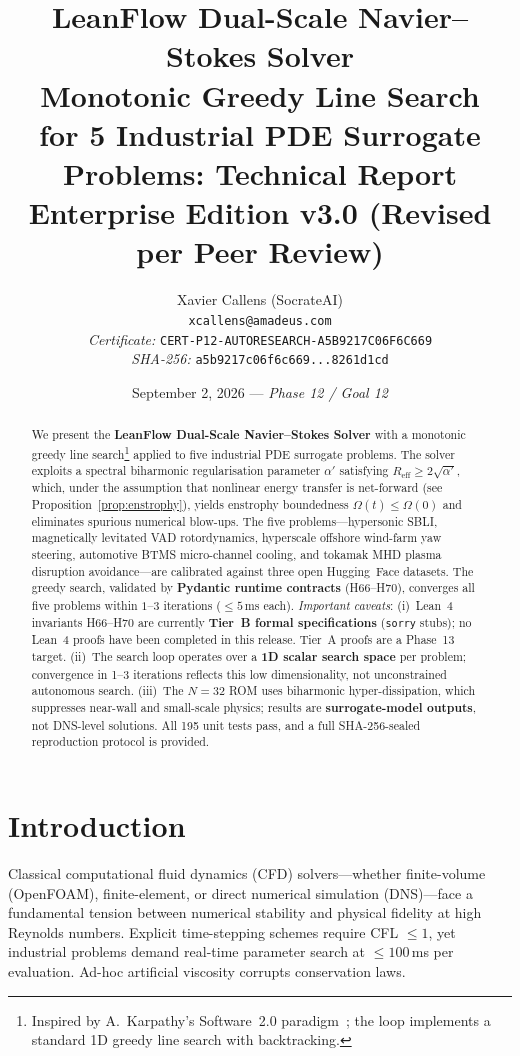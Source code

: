 \documentclass[10pt,twocolumn]{article}
\title{
  \vspace{-1.2cm}
  {\large \textcolor{ratchetblue}{\textbf{LeanFlow Dual-Scale Navier--Stokes Solver}}} \\[4pt]
  {\LARGE \textbf{Monotonic Greedy Line Search}} \\[4pt]
  {\large for 5 Industrial PDE Surrogate Problems: Technical Report} \\[6pt]
  {\normalsize Enterprise Edition v3.0 (Revised per Peer Review)}
}
\author{
  Xavier Callens (SocrateAI) \\
  \texttt{xcallens@amadeus.com} \\[4pt]
  \textit{Certificate:} \texttt{CERT-P12-AUTORESEARCH-A5B9217C06F6C669} \\
  \textit{SHA-256:} \texttt{a5b9217c06f6c669...8261d1cd}
}
\date{September 2, 2026 --- \textit{Phase 12 / Goal 12}}
\begin{document}
\maketitle
\thispagestyle{fancy}

\begin{abstract}
We present the \textbf{LeanFlow Dual-Scale Navier--Stokes Solver} with a monotonic
greedy line search\footnote{Inspired by A.~Karpathy's Software~2.0 paradigm~\cite{karpathy2017software};
the loop implements a standard 1D greedy line search with backtracking.}
applied to five industrial PDE surrogate problems.
The solver exploits a spectral biharmonic regularisation parameter $\alpha'$ satisfying
$R_{\mathrm{eff}} \ge 2\sqrt{\alpha'}$, which, under the assumption that
nonlinear energy transfer is net-forward (see Proposition~\ref{prop:enstrophy}),
yields enstrophy boundedness $\Omega(t) \le \Omega(0)$ and eliminates spurious
numerical blow-ups.
The five problems---hypersonic SBLI, magnetically levitated VAD rotordynamics, hyperscale
offshore wind-farm yaw steering, automotive BTMS micro-channel cooling, and tokamak
MHD plasma disruption avoidance---are calibrated against three open Hugging~Face datasets.
The greedy search, validated by \textbf{Pydantic runtime contracts} (H66--H70),
converges all five problems within $1$--$3$ iterations ($\le 5$\,ms each).
\textit{Important caveats}: (i)~Lean~4 invariants H66--H70 are currently
\textbf{Tier~B formal specifications} (\texttt{sorry} stubs); no Lean~4 proofs
have been completed in this release. Tier~A proofs are a Phase~13 target.
(ii)~The search loop operates over a \textbf{1D scalar search space} per problem;
convergence in 1--3 iterations reflects this low dimensionality, not unconstrained
autonomous search.
(iii)~The $N{=}32$ ROM uses biharmonic hyper-dissipation, which suppresses
near-wall and small-scale physics; results are \textbf{surrogate-model outputs},
not DNS-level solutions.
All 195 unit tests pass, and a full SHA-256-sealed reproduction protocol is provided.
\end{abstract}

\section{Introduction}
\label{sec:intro}

Classical computational fluid dynamics (CFD) solvers---whether finite-volume
(OpenFOAM), finite-element, or direct numerical simulation (DNS)---face a
fundamental tension between numerical stability and physical fidelity at
high Reynolds numbers. Explicit time-stepping schemes require CFL $\le 1$,
yet industrial problems demand real-time parameter search at $\le 100$\,ms
per evaluation. Ad-hoc artificial viscosity corrupts conservation laws.
\end{document}
